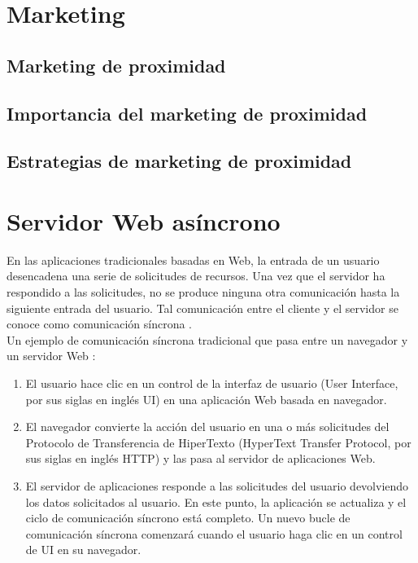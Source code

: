 \section{Marketing}
\subsection{Marketing de proximidad}
\subsection{Importancia del marketing de proximidad}
\subsection{Estrategias de marketing de proximidad}



\section{Servidor Web asíncrono }

En las aplicaciones tradicionales basadas en Web, la entrada de un usuario desencadena una serie de solicitudes de recursos. Una vez que el servidor ha respondido a las solicitudes, no se produce ninguna otra comunicación hasta la siguiente entrada del usuario. Tal comunicación entre el cliente y el servidor se conoce como comunicación síncrona \cite{s/a communication}. \\

Un ejemplo de comunicación síncrona tradicional que pasa entre un navegador y un servidor Web \cite{s/a communication}:
\linebreak
\begin{enumerate}
\item El usuario hace clic en un control de la interfaz de usuario (User Interface, por sus siglas en inglés UI) en una aplicación Web basada en navegador.
\item El navegador convierte la acción del usuario en una o más solicitudes del Protocolo de Transferencia de HiperTexto (HyperText Transfer Protocol, por sus siglas en inglés HTTP) y las pasa al servidor de aplicaciones Web.
\item El servidor de aplicaciones responde a las solicitudes del usuario devolviendo los datos solicitados al usuario. En este punto, la aplicación se actualiza y el ciclo de comunicación síncrono está completo. Un nuevo bucle de comunicación síncrona comenzará cuando el usuario haga clic en un control de UI en su navegador.
\end{enumerate}

